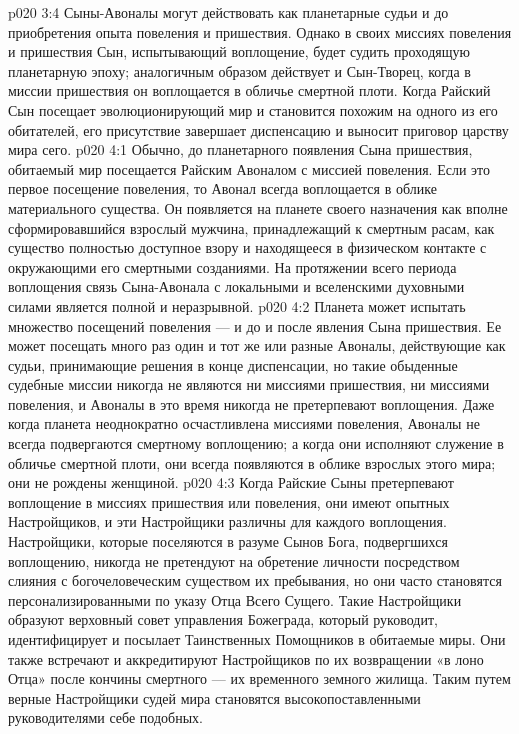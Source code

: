 \vs p020 3:4 Сыны\hyp{}Авоналы могут действовать как планетарные судьи и до приобретения опыта повеления и пришествия. Однако в своих миссиях повеления и пришествия Сын, испытывающий воплощение, будет судить проходящую планетарную эпоху; аналогичным образом действует и Сын\hyp{}Творец, когда в миссии пришествия он воплощается в обличье смертной плоти. Когда Райский Сын посещает эволюционирующий мир и становится похожим на одного из его обитателей, его присутствие завершает диспенсацию и выносит приговор царству мира сего.
\vs p020 4:1 Обычно, до планетарного появления Сына пришествия, обитаемый мир посещается Райским Авоналом с миссией повеления. Если это первое посещение повеления, то Авонал всегда воплощается в облике материального существа. Он появляется на планете своего назначения как вполне сформировавшийся взрослый мужчина, принадлежащий к смертным расам, как существо полностью доступное взору и находящееся в физическом контакте с окружающими его смертными созданиями. На протяжении всего периода воплощения связь Сына\hyp{}Авонала с локальными и вселенскими духовными силами является полной и неразрывной.
\vs p020 4:2 Планета может испытать множество посещений повеления --- и до и после явления Сына пришествия. Ее может посещать много раз один и тот же или разные Авоналы, действующие как судьи, принимающие решения в конце диспенсации, но такие обыденные судебные миссии никогда не являются ни миссиями пришествия, ни миссиями повеления, и Авоналы в это время никогда не претерпевают воплощения. Даже когда планета неоднократно осчастливлена миссиями повеления, Авоналы не всегда подвергаются смертному воплощению; а когда они исполняют служение в обличье смертной плоти, они всегда появляются в облике взрослых этого мира; они не рождены женщиной.
\vs p020 4:3 Когда Райские Сыны претерпевают воплощение в миссиях пришествия или повеления, они имеют опытных Настройщиков, и эти Настройщики различны для каждого воплощения. Настройщики, которые поселяются в разуме Сынов Бога, подвергшихся воплощению, никогда не претендуют на обретение личности посредством слияния с богочеловеческим существом их пребывания, но они часто становятся персонализированными по указу Отца Всего Сущего. Такие Настройщики образуют верховный совет управления Божеграда, который руководит, идентифицирует и посылает Таинственных Помощников в обитаемые миры. Они также встречают и аккредитируют Настройщиков по их возвращении «в лоно Отца» после кончины смертного --- их временного земного жилища. Таким путем верные Настройщики судей мира становятся высокопоставленными руководителями себе подобных.

